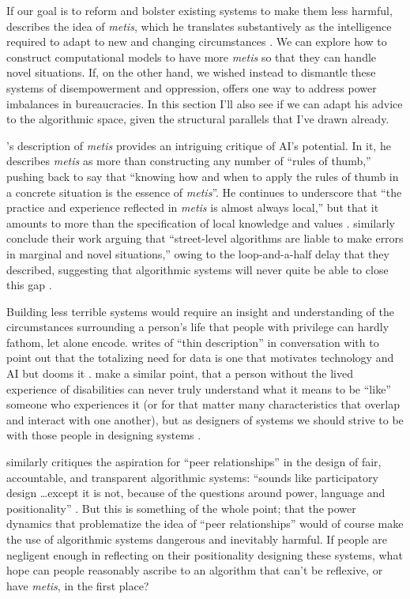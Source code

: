 \documentclass[manuscript,screen]{acmart}
\begin{document}
If our goal is to reform and bolster existing systems to make them less harmful, \citeauthor{scott1998seeing} describes the idea of \emph{metis}, which he translates substantively as the intelligence required to adapt to new and changing circumstances
\cite{scott1998seeing}.
We can explore how to construct computational models to have more \emph{metis} so that they can handle novel situations.
If, on the other hand, we wished instead to dismantle these systems of disempowerment and oppression, \citeauthor{graeber2015utopia} offers one way to address power imbalances in bureaucracies.
In this section I'll also see if we can adapt his advice to the algorithmic space, given the structural parallels that I've drawn already.

\citeauthor{scott1998seeing}'s description of \emph{metis} provides an intriguing critique of AI's potential.
In it, he describes \emph{metis} as more than constructing any number of ``rules of thumb,'' pushing back to say that ``knowing how and when to apply the rules of thumb in a concrete situation is the essence of \emph{metis}''.
He continues to underscore that ``the practice and experience reflected in \emph{metis} is almost always local,'' but that it amounts to more than the specification of local knowledge and values
\cite{scott1998seeing}.
\citeauthor{streetLevelAlgorithms} similarly conclude their work arguing that ``street-level algorithms are liable to make errors in marginal and novel situations,'' owing to the loop-and-a-half delay that they described, suggesting that algorithmic systems will never quite be able to close this gap
\cite{streetLevelAlgorithms}.

Building less terrible systems would require an insight and understanding of the circumstances surrounding a person's life that people with privilege can hardly fathom, let alone encode.
\citeauthor{benjamin2019race} writes of ``thin description'' in conversation with \citeauthor{jackson2013thin} to point out that the totalizing need for data is one that motivates technology and AI but dooms it
\cite{benjamin2019race}.
\citeauthor{10.1145/3290605.3300528} make a similar point, that a person without the lived experience of disabilities can never truly understand what it means to be ``like'' someone who experiences it (or for that matter many characteristics that overlap and interact with one another), but as designers of systems we should strive to be with those people in designing systems
\cite{10.1145/3290605.3300528}.

\citeauthor{fatBeWilin} similarly critiques the aspiration for ``peer relationships'' in the design of fair, accountable, and transparent algorithmic systems: ``sounds like participatory design \dots except it is not, because of the questions around power, language and positionality''
\cite{fatBeWilin}.
But this is something of the whole point;
that the power dynamics that problematize the idea of ``peer relationships'' would of course make the use of algorithmic systems dangerous and inevitably harmful.
If people are negligent enough in reflecting on their positionality designing these systems, what hope can people reasonably ascribe to an algorithm that can't be reflexive, or have \emph{metis}, in the first place?
\end{document}
